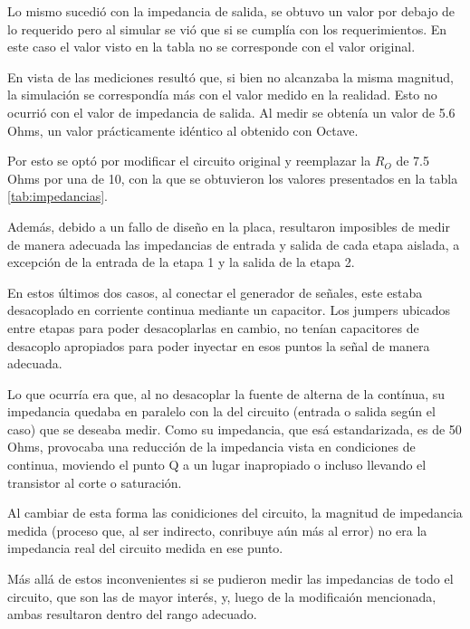Lo mismo sucedió con la impedancia de salida, se obtuvo un valor por debajo de lo requerido pero al simular se vió que si se cumplía con los requerimientos. En este caso el valor visto en la tabla no se corresponde con el valor original.

En vista de las mediciones resultó que, si bien no alcanzaba la misma magnitud, la simulación se correspondía más con el valor medido en la realidad. Esto no ocurrió con el valor de impedancia de salida. Al medir se obtenía un valor de 5.6 Ohms, un valor prácticamente idéntico al obtenido con Octave.

Por esto se optó por modificar el circuito original y reemplazar la $R_O$ de 7.5 Ohms por una de 10, con la que se obtuvieron los valores presentados en la tabla \ref{tab:impedancias}.

Además, debido a un fallo de diseño en la placa, resultaron imposibles de medir de manera adecuada las impedancias de entrada y salida de cada etapa aislada, a excepción de la entrada de la etapa 1 y la salida de la etapa 2.

En estos últimos dos casos, al conectar el generador de señales, este estaba desacoplado en corriente continua mediante un capacitor. Los jumpers ubicados entre etapas para poder desacoplarlas en cambio, no tenían capacitores de desacoplo apropiados para poder inyectar en esos puntos la señal de manera adecuada.

Lo que ocurría era que, al no desacoplar la fuente de alterna de la contínua, su impedancia quedaba en paralelo con la del circuito (entrada o salida según el caso) que se deseaba medir. Como su impedancia, que esá estandarizada, es de 50 Ohms, provocaba una reducción de la impedancia vista en condiciones de continua, moviendo el punto Q a un lugar inapropiado o incluso llevando el transistor al corte o saturación.

Al cambiar de esta forma las conidiciones del circuito, la magnitud de impedancia medida (proceso que, al ser indirecto, conribuye aún más al error) no era la impedancia real del circuito medida en ese punto.

Más allá de estos inconvenientes si se pudieron medir las impedancias de todo el circuito, que son las de mayor interés, y, luego de la modificaión mencionada, ambas resultaron dentro del rango adecuado.

